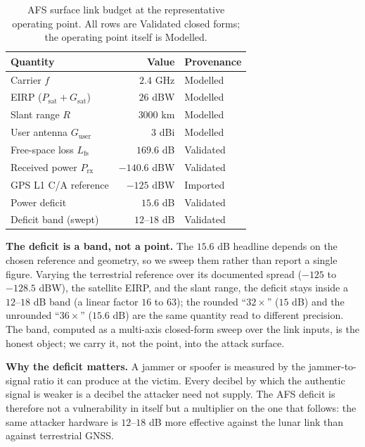 \documentclass[conference]{IEEEtran}
\begin{document}
\begin{table}[t]
\centering
\caption{AFS surface link budget at the representative operating point. All rows
are Validated closed forms; the operating point itself is Modelled.}
\label{tab:budget}
\begin{tabular}{lrl}
\toprule
Quantity & Value & Provenance \\
\midrule
Carrier $f$                       & $2.4$ GHz       & Modelled \\
EIRP ($P_{\mathrm{sat}}+G_{\mathrm{sat}}$) & $26$ dBW & Modelled \\
Slant range $R$                   & $3000$ km       & Modelled \\
User antenna $G_{\mathrm{user}}$  & $3$ dBi         & Modelled \\
Free-space loss $L_{\mathrm{fs}}$ & $169.6$ dB      & Validated \\
Received power $P_{\mathrm{rx}}$  & $-140.6$ dBW    & Validated \\
GPS L1 C/A reference              & $-125$ dBW      & Imported \\
Power deficit                     & $15.6$ dB       & Validated \\
Deficit band (swept)              & $12$--$18$ dB   & Validated \\
\bottomrule
\end{tabular}
\end{table}

\textbf{The deficit is a band, not a point.} The $15.6$ dB headline depends on the
chosen reference and geometry, so we sweep them rather than report a single figure.
Varying the terrestrial reference over its documented spread ($-125$ to $-128.5$
dBW), the satellite EIRP, and the slant range, the deficit stays inside a
$12$--$18$ dB band (a linear factor $16$ to $63$); the rounded ``$32\times$''
($15$ dB) and the unrounded ``$36\times$'' ($15.6$ dB) are the same quantity read
to different precision. The band, computed as a multi-axis closed-form sweep over
the link inputs, is the honest object; we carry it, not the point, into the attack
surface.

\textbf{Why the deficit matters.} A jammer or spoofer is measured by the
jammer-to-signal ratio it can produce at the victim. Every decibel by which the
authentic signal is weaker is a decibel the attacker need not supply. The AFS
deficit is therefore not a vulnerability in itself but a multiplier on the one that
follows: the same attacker hardware is $12$--$18$ dB more effective against the
lunar link than against terrestrial GNSS.
\end{document}
